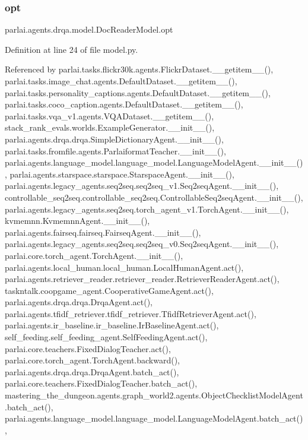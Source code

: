 \subsubsection{\texorpdfstring{opt}{opt}}
{\footnotesize\ttfamily parlai.\+agents.\+drqa.\+model.\+Doc\+Reader\+Model.\+opt}



Definition at line 24 of file model.\+py.



Referenced by parlai.\+tasks.\+flickr30k.\+agents.\+Flickr\+Dataset.\+\_\+\+\_\+getitem\+\_\+\+\_\+(), parlai.\+tasks.\+image\+\_\+chat.\+agents.\+Default\+Dataset.\+\_\+\+\_\+getitem\+\_\+\+\_\+(), parlai.\+tasks.\+personality\+\_\+captions.\+agents.\+Default\+Dataset.\+\_\+\+\_\+getitem\+\_\+\+\_\+(), parlai.\+tasks.\+coco\+\_\+caption.\+agents.\+Default\+Dataset.\+\_\+\+\_\+getitem\+\_\+\+\_\+(), parlai.\+tasks.\+vqa\+\_\+v1.\+agents.\+V\+Q\+A\+Dataset.\+\_\+\+\_\+getitem\+\_\+\+\_\+(), stack\+\_\+rank\+\_\+evals.\+worlds.\+Example\+Generator.\+\_\+\+\_\+init\+\_\+\+\_\+(), parlai.\+agents.\+drqa.\+drqa.\+Simple\+Dictionary\+Agent.\+\_\+\+\_\+init\+\_\+\+\_\+(), parlai.\+tasks.\+fromfile.\+agents.\+Parlaiformat\+Teacher.\+\_\+\+\_\+init\+\_\+\+\_\+(), parlai.\+agents.\+language\+\_\+model.\+language\+\_\+model.\+Language\+Model\+Agent.\+\_\+\+\_\+init\+\_\+\+\_\+(), parlai.\+agents.\+starspace.\+starspace.\+Starspace\+Agent.\+\_\+\+\_\+init\+\_\+\+\_\+(), parlai.\+agents.\+legacy\+\_\+agents.\+seq2seq.\+seq2seq\+\_\+v1.\+Seq2seq\+Agent.\+\_\+\+\_\+init\+\_\+\+\_\+(), controllable\+\_\+seq2seq.\+controllable\+\_\+seq2seq.\+Controllable\+Seq2seq\+Agent.\+\_\+\+\_\+init\+\_\+\+\_\+(), parlai.\+agents.\+legacy\+\_\+agents.\+seq2seq.\+torch\+\_\+agent\+\_\+v1.\+Torch\+Agent.\+\_\+\+\_\+init\+\_\+\+\_\+(), kvmemnn.\+Kvmemnn\+Agent.\+\_\+\+\_\+init\+\_\+\+\_\+(), parlai.\+agents.\+fairseq.\+fairseq.\+Fairseq\+Agent.\+\_\+\+\_\+init\+\_\+\+\_\+(), parlai.\+agents.\+legacy\+\_\+agents.\+seq2seq.\+seq2seq\+\_\+v0.\+Seq2seq\+Agent.\+\_\+\+\_\+init\+\_\+\+\_\+(), parlai.\+core.\+torch\+\_\+agent.\+Torch\+Agent.\+\_\+\+\_\+init\+\_\+\+\_\+(), parlai.\+agents.\+local\+\_\+human.\+local\+\_\+human.\+Local\+Human\+Agent.\+act(), parlai.\+agents.\+retriever\+\_\+reader.\+retriever\+\_\+reader.\+Retriever\+Reader\+Agent.\+act(), taskntalk.\+coopgame\+\_\+agent.\+Cooperative\+Game\+Agent.\+act(), parlai.\+agents.\+drqa.\+drqa.\+Drqa\+Agent.\+act(), parlai.\+agents.\+tfidf\+\_\+retriever.\+tfidf\+\_\+retriever.\+Tfidf\+Retriever\+Agent.\+act(), parlai.\+agents.\+ir\+\_\+baseline.\+ir\+\_\+baseline.\+Ir\+Baseline\+Agent.\+act(), self\+\_\+feeding.\+self\+\_\+feeding\+\_\+agent.\+Self\+Feeding\+Agent.\+act(), parlai.\+core.\+teachers.\+Fixed\+Dialog\+Teacher.\+act(), parlai.\+core.\+torch\+\_\+agent.\+Torch\+Agent.\+backward(), parlai.\+agents.\+drqa.\+drqa.\+Drqa\+Agent.\+batch\+\_\+act(), parlai.\+core.\+teachers.\+Fixed\+Dialog\+Teacher.\+batch\+\_\+act(), mastering\+\_\+the\+\_\+dungeon.\+agents.\+graph\+\_\+world2.\+agents.\+Object\+Checklist\+Model\+Agent.\+batch\+\_\+act(), parlai.\+agents.\+language\+\_\+model.\+language\+\_\+model.\+Language\+Model\+Agent.\+batch\+\_\+act(), 